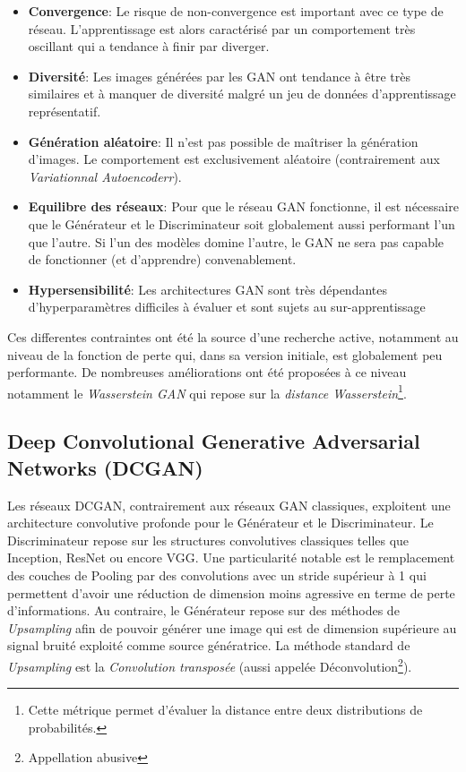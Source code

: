 \begin{itemize}
    \item \textbf{Convergence}: Le risque de non-convergence est important avec ce type de réseau. L'apprentissage est alors caractérisé par un comportement très oscillant qui a tendance à finir par diverger.\\

    \item \textbf{Diversité}: Les images générées par les GAN ont tendance à être très similaires et à manquer de diversité malgré un jeu de données d'apprentissage représentatif.\\

    \item \textbf{Génération aléatoire}: Il n'est pas possible de maîtriser la génération d'images. Le comportement est exclusivement aléatoire (contrairement aux \textit{ Variationnal Autoencoderr}).\\

    \item \textbf{Equilibre des réseaux}: Pour que le réseau GAN fonctionne, il est nécessaire que le Générateur et le Discriminateur soit globalement aussi performant l'un que l'autre. Si l'un des modèles domine l'autre, le GAN ne sera pas capable de fonctionner (et d'apprendre) convenablement.\\

    \item \textbf{Hypersensibilité}: Les architectures GAN sont très dépendantes d'hyperparamètres difficiles à évaluer et sont sujets au sur-apprentissage\\
\end{itemize}

\noindent Ces differentes contraintes ont été la source d'une recherche active, notamment au niveau de la fonction de perte qui, dans sa version initiale, est globalement peu performante. De nombreuses améliorations ont été proposées à ce niveau notamment le \textit{Wasserstein GAN}\cite{wasserstein} qui repose sur la \textit{distance Wasserstein}\footnote{Cette métrique permet d'évaluer la distance entre deux distributions de probabilités.}.

\subsection{Deep Convolutional Generative Adversarial Networks (DCGAN)}
Les réseaux DCGAN\cite{dcgan}, contrairement aux réseaux GAN classiques, exploitent une architecture convolutive profonde pour le Générateur et le Discriminateur. Le Discriminateur repose sur les structures convolutives classiques telles que Inception, ResNet ou encore VGG. Une particularité notable est le remplacement des couches de Pooling par des convolutions avec un stride supérieur à 1 qui permettent d'avoir une réduction de dimension moins agressive en terme de perte d'informations. Au contraire, le Générateur repose sur des méthodes de \textit{Upsampling} afin de pouvoir générer une image qui est de dimension supérieure au signal bruité exploité comme source génératrice. La méthode standard de \textit{Upsampling} est la \textit{Convolution transposée} (aussi appelée Déconvolution\footnote{Appellation abusive}).

